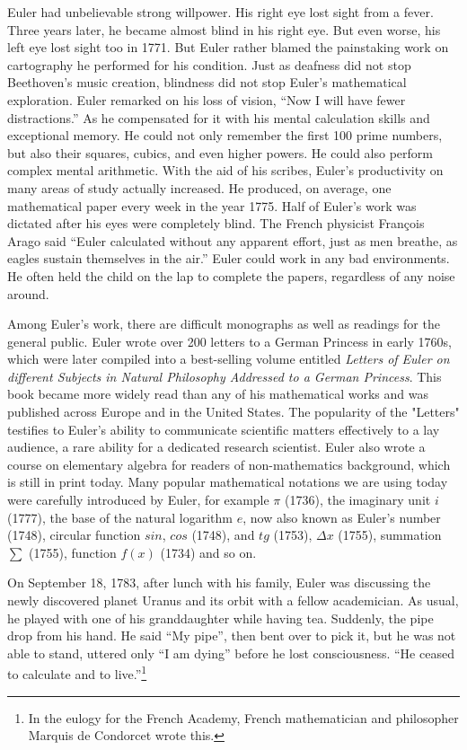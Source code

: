 \documentclass[b5paper]{article}
\begin{document}
Euler had unbelievable strong willpower. His right eye lost sight from a fever. Three years later, he became almost blind in his right eye. But even worse, his left eye lost sight too in 1771. But Euler rather blamed the painstaking work on cartography he performed for his condition. Just as deafness did not stop Beethoven’s music creation, blindness did not stop Euler’s mathematical exploration\cite{HanXueTao2009}. Euler remarked on his loss of vision, ``Now I will have fewer distractions.'' As he compensated for it with his mental calculation skills and exceptional memory. He could not only remember the first 100 prime numbers, but also their squares, cubics, and even higher powers. He could also perform complex mental arithmetic. With the aid of his scribes, Euler's productivity on many areas of study actually increased. He produced, on average, one mathematical paper every week in the year 1775. Half of Euler's work was dictated after his eyes were completely blind. The French physicist François Arago said ``Euler calculated without any apparent effort, just as men breathe, as eagles sustain themselves in the air.'' Euler could work in any bad environments. He often held the child on the lap to complete the papers, regardless of any noise around.

Among Euler's work, there are difficult monographs as well as readings for the general public. Euler wrote over 200 letters to a German Princess in early 1760s, which were later compiled into a best-selling volume entitled {\em Letters of Euler on different Subjects in Natural Philosophy Addressed to a German Princess}. This book became more widely read than any of his mathematical works and was published across Europe and in the United States. The popularity of the "Letters" testifies to Euler's ability to communicate scientific matters effectively to a lay audience, a rare ability for a dedicated research scientist. Euler also wrote a course on elementary algebra for readers of non-mathematics background, which is still in print today. Many popular mathematical notations we are using today were carefully introduced by Euler, for example $\pi$ (1736), the imaginary unit $i$ (1777), the base of the natural logarithm $e$, now also known as Euler's number (1748), circular function $sin$, $cos$ (1748), and $tg$ (1753), $\Delta x$ (1755), summation $\sum$ (1755), function $f(x)$ (1734) and so on\cite{HanXueTao2009}.

On September 18, 1783, after lunch with his family, Euler was discussing the newly discovered planet Uranus and its orbit with a fellow academician. As usual, he played with one of his granddaughter while having tea. Suddenly, the pipe drop from his hand. He said ``My pipe'', then bent over to pick it, but he was not able to stand, uttered only ``I am dying'' before he lost consciousness. ``He ceased to calculate and to live.''\footnote{In the eulogy for the French Academy, French mathematician and philosopher Marquis de Condorcet wrote this.}
\end{document}
